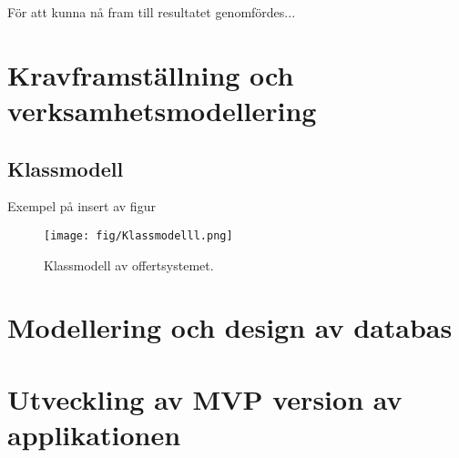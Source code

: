 För att kunna nå fram till resultatet genomfördes...

\section{Kravframställning och verksamhetsmodellering}\label{sec:arbkrav}

\subsection{Klassmodell}
Exempel på insert av figur
\begin{figure}[!ht]
\centering
\texttt{[image: fig/Klassmodelll.png]}
\caption{\label{fig:klassModell}Klassmodell av offertsystemet.}
\end{figure}


\section{Modellering och design av databas}

\section{Utveckling av MVP version av applikationen}\label{sec:arbmvp}


